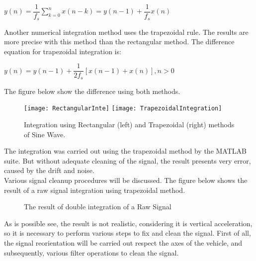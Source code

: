 \documentclass{standalone}
\begin{document}
\begin{center}
$y(n) = \dfrac{1}{f_{s}} \sum_{k=0}^{n} x(n-k) = y(n-1) + \dfrac{1}{f_{s}} x(n)$
\end{center}

\noindent Another numerical integration method uses the trapezoidal rule. 
The results are more precise with this method than the rectangular method. The difference equation for trapezoidal integration is:

\begin{center}
$y(n) = y(n-1) + \dfrac{1}{2 f_{s}}[x(n-1) + x(n)], n > 0$
\end{center}

The figure below show the difference using both methods.

\vspace{0.35cm}
\begin{figure}[ht]
\centering
\texttt{[image: RectangularInte]}
\hspace{0.5cm}
\texttt{[image: TrapezoidalIntegration]}
\caption{Integration using Rectangular (left) and Trapezoidal (right) methods of Sine Wave.}
\label{fig:Rectangular and Trapezoidal Integration}
\end{figure}

\noindent The integration was carried out using the trapezoidal method by the MATLAB suite. But without adequate cleaning of the signal, the result presents very error, caused by the drift and noise. \\
Various signal cleanup procedures will be discussed. The figure below shows the result of a raw signal integration using trapezoidal method.

\begin{figure}
  \centering
  

  \caption{The result of double integration of a Raw Signal}
  \label{fig:Integration of Raw Data}
\end{figure}
\clearpage

\noindent As is possible see, the result is not realistic, considering it is vertical acceleration, so it is necessary to perform various steps to fix and clean the signal. First of all, the signal reorientation will be carried out respect the axes of the vehicle, and subsequently, various filter operations to clean the signal.
\end{document}
